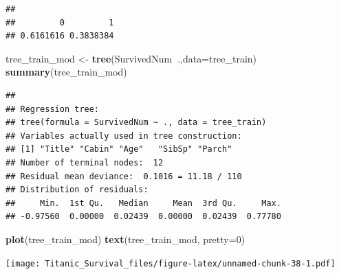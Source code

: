 \documentclass[]{article}
\newenvironment{Shaded}{\begin{snugshade}}{\end{snugshade}}
\newcommand{\KeywordTok}[1]{\textcolor[rgb]{0.13,0.29,0.53}{\textbf{#1}}}
\newcommand{\DataTypeTok}[1]{\textcolor[rgb]{0.13,0.29,0.53}{#1}}
\newcommand{\DecValTok}[1]{\textcolor[rgb]{0.00,0.00,0.81}{#1}}
\newcommand{\StringTok}[1]{\textcolor[rgb]{0.31,0.60,0.02}{#1}}
\newcommand{\OperatorTok}[1]{\textcolor[rgb]{0.81,0.36,0.00}{\textbf{#1}}}
\newcommand{\NormalTok}[1]{#1}
\begin{document}
\begin{verbatim}
## 
##         0         1 
## 0.6161616 0.3838384
\end{verbatim}

\begin{Shaded}
\begin{Highlighting}[]
\NormalTok{tree_train_mod <-}\StringTok{ }\KeywordTok{tree}\NormalTok{(SurvivedNum}\OperatorTok{~}\NormalTok{.,}\DataTypeTok{data=}\NormalTok{tree_train)}
\KeywordTok{summary}\NormalTok{(tree_train_mod)}
\end{Highlighting}
\end{Shaded}

\begin{verbatim}
## 
## Regression tree:
## tree(formula = SurvivedNum ~ ., data = tree_train)
## Variables actually used in tree construction:
## [1] "Title" "Cabin" "Age"   "SibSp" "Parch"
## Number of terminal nodes:  12 
## Residual mean deviance:  0.1016 = 11.18 / 110 
## Distribution of residuals:
##     Min.  1st Qu.   Median     Mean  3rd Qu.     Max. 
## -0.97560  0.00000  0.02439  0.00000  0.02439  0.77780
\end{verbatim}

\begin{Shaded}
\begin{Highlighting}[]
\KeywordTok{plot}\NormalTok{(tree_train_mod)}
\KeywordTok{text}\NormalTok{(tree_train_mod, }\DataTypeTok{pretty=}\DecValTok{0}\NormalTok{)}
\end{Highlighting}
\end{Shaded}

\texttt{[image: Titanic\_Survival\_files/figure-latex/unnamed-chunk-38-1.pdf]}
\end{document}
